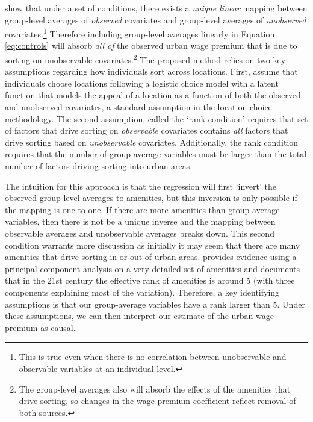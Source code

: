 \documentclass[12pt,twoside]{article}
\begin{document}
\citet{altonji2018estimating} show that under a set of conditions, there exists a \emph{unique linear} mapping between group-level averages of \emph{observed} covariates and group-level averages of \emph{unobserved} covariates.\footnote{This is true even when there is no correlation between unobservable and observable variables at an individual-level.} 
Therefore including group-level averages linearly in Equation \ref{eq:controls} will absorb \emph{all of} the observed urban wage premium that is due to sorting on unobservable covariates.\footnote{The group-level averages also will absorb the effects of the amenities that drive sorting, so changes in the wage premium coefficient reflect removal of both sources.}
The proposed method relies on two key assumptions regarding how individuals sort across locations. 
First,  \citet{altonji2018estimating} assume that individuals choose locations following a logistic choice model with a latent function that models the appeal of a location as a function of both the observed and unobserved covariates, a standard assumption in the location choice methodology.
The second assumption, called the `rank condition' requires that set of factors that drive sorting on \emph{observable} covariates contains \emph{all} factors that drive sorting based on \emph{unobservable} covariates. 
Additionally, the rank condition requires that the number of group-average variables must be larger than the total number of factors driving sorting into urban areas. 

The intuition for this approach is that the regression will first `invert' the observed group-level averages to amenities, but this inversion is only possible if the mapping is one-to-one. 
If there are more amenities than group-average variables, then there is not be a unique inverse and the mapping between observable averages and unobservable averages breaks down. 
This second condition warrants more discussion as initially it may seem that there are many amenities that drive sorting in or out of urban areas. 
\citet{Diamond_2016} provides evidence using a principal component analysis on a very detailed set of amenities and documents that in the 21st century the effective rank of amenities is around 5 (with three components explaining most of the variation). 
Therefore, a key identifying assumptions is that our group-average variables have a rank larger than 5. %
Under these assumptions, we can then interpret our estimate of the urban wage premium as causal. 
\end{document}
